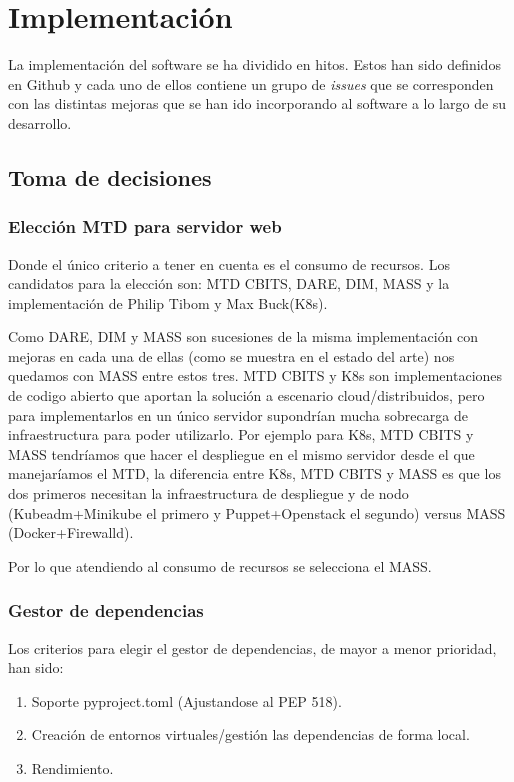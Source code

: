 \chapter{Implementación}

La implementación del software se ha dividido en hitos. Estos han sido definidos en Github
y cada uno de ellos contiene un grupo de \textit{issues} que se corresponden con las distintas
mejoras que se han ido incorporando al software a lo largo de su desarrollo.

\section{Toma de decisiones}

\subsection{Elección MTD para servidor web}
Donde el único criterio a tener en cuenta es el consumo de recursos.
Los candidatos para la elección son: MTD CBITS, DARE, DIM, MASS y la implementación de Philip Tibom y Max Buck\cite{MTD-gotemburgo}(K8s).

Como DARE, DIM y MASS son sucesiones de la misma implementación con mejoras en cada una de ellas (como se muestra en el estado del arte) nos quedamos con MASS entre estos tres.
MTD CBITS y K8s son implementaciones de codigo abierto que aportan la solución a escenario cloud/distribuidos, pero para implementarlos en un único servidor supondrían mucha sobrecarga de infraestructura para poder utilizarlo. Por ejemplo para K8s, MTD CBITS y MASS tendríamos que hacer el despliegue en el mismo servidor desde el que manejaríamos el MTD, la diferencia entre K8s, MTD CBITS y MASS es que los dos primeros necesitan la infraestructura de despliegue y de nodo (Kubeadm+Minikube el primero y Puppet+Openstack el segundo) versus MASS (Docker+Firewalld). 

Por lo que atendiendo al consumo de recursos se selecciona el MASS.

\subsection{Gestor de dependencias}
Los criterios para elegir el gestor de dependencias, de mayor a menor prioridad, han sido:
\begin{enumerate}
    \item Soporte pyproject.toml (Ajustandose al PEP 518\cite{pep-pyproject}).
    \item Creación de entornos virtuales/gestión las dependencias de forma local.
    \item Rendimiento.
\end{enumerate}

